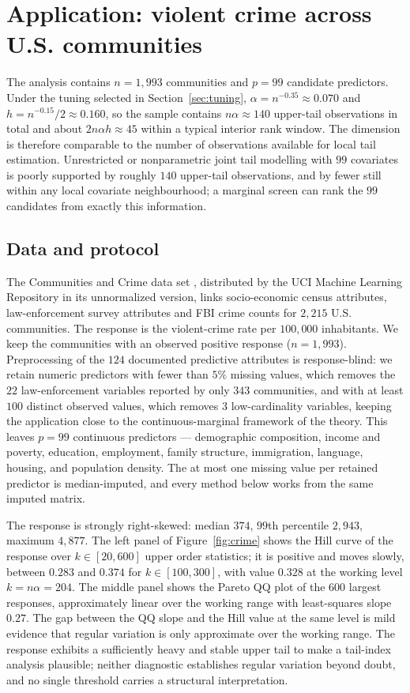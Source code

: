 \section{Application: violent crime across U.S. communities}
\label{sec:realdata}

The analysis contains $n=1{,}993$ communities and $p=99$ candidate
predictors. Under the tuning selected in Section~\ref{sec:tuning},
$\alpha=n^{-0.35}\approx0.070$ and $h=n^{-0.15}/2\approx0.160$, so the
sample contains $n\alpha\approx140$ upper-tail observations in total and
about $2n\alpha h\approx45$ within a typical interior rank window. The
dimension is therefore comparable to the number of observations
available for local tail estimation. Unrestricted or nonparametric joint
tail modelling with $99$ covariates is poorly supported by roughly $140$
upper-tail observations, and by fewer still within any local covariate
neighbourhood; a marginal screen can rank the $99$ candidates from
exactly this information.

\subsection{Data and protocol}

The Communities and Crime data set
\citep{redmond2002}, distributed by the UCI Machine Learning Repository
in its unnormalized version, links socio-economic census attributes,
law-enforcement survey attributes and FBI crime counts for $2{,}215$ U.S.
communities. The response is the violent-crime rate per $100{,}000$
inhabitants. We keep the communities with an observed positive response
($n=1{,}993$). Preprocessing of the $124$ documented predictive
attributes is response-blind: we retain numeric predictors with fewer
than $5\%$ missing values, which removes the $22$ law-enforcement
variables reported by only $343$ communities, and with at least $100$
distinct observed values, which removes $3$ low-cardinality variables,
keeping the application close to the continuous-marginal framework of
the theory. This leaves $p=99$ continuous predictors --- demographic
composition, income and poverty, education, employment, family
structure, immigration, language, housing, and population density. The
at most one missing value per retained predictor is median-imputed, and
every method below works from the same imputed matrix.

The response is strongly right-skewed: median $374$, $99$th percentile
$2{,}943$, maximum $4{,}877$. The left panel of Figure~\ref{fig:crime}
shows the Hill curve of the response over $k\in[20,600]$ upper order
statistics; it is positive and moves slowly, between $0.283$ and
$0.374$ for $k\in[100,300]$, with value $0.328$ at the working level
$k=n\alpha=204$. The middle panel shows the Pareto QQ plot of the $600$
largest responses, approximately linear over the working range with
least-squares slope $0.27$. The gap between the QQ slope and the Hill
value at the same level is mild evidence that regular variation is only
approximate over the working range. The response exhibits a
sufficiently heavy and stable upper tail to make a tail-index analysis
plausible; neither diagnostic establishes regular variation beyond
doubt, and no single threshold carries a structural interpretation.


